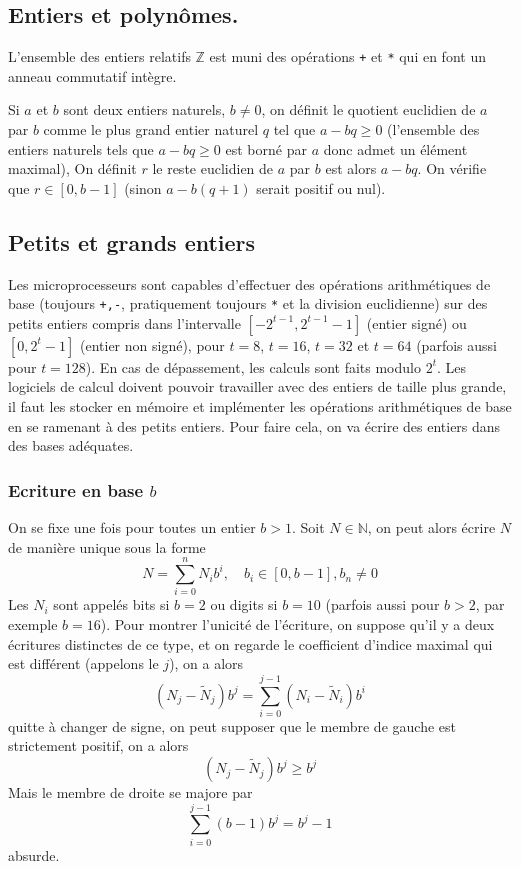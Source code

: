 \documentclass[a4paper,11pt]{book}
\begin{document}
\begin{giacjshere}
\section{Entiers et polyn\^omes.}
L'ensemble des entiers relatifs $\mathbb{Z}$ est muni des op\'erations
\verb|+| et \verb|*| qui en font un anneau commutatif int\`egre. 

Si $a$ et $b$ sont deux entiers naturels, $b \neq 0$, on d\'efinit le
quotient euclidien de $a$ par $b$ comme le plus grand entier naturel
$q$  tel que $a-bq \geq 0$ (l'ensemble des entiers naturels tels que
$a-bq \geq 0$ est born\'e par $a$ donc admet un \'el\'ement maximal),
On d\'efinit $r$ le reste euclidien de $a$ par $b$ est alors $a-bq$. On v\'erifie
que $r \in [0,b-1]$ (sinon $a-b(q+1)$ serait positif ou nul).

\subsection{Petits et grands entiers}
Les microprocesseurs sont capables d'effectuer des
op\'erations arithm\'etiques de base (toujours \verb|+,-|, pratiquement
toujours \verb|*| et la division euclidienne) sur des petits entiers compris dans l'intervalle
$[-2^{t-1},2^{t-1}-1]$ (entier sign\'e) ou $[0,2^{t}-1]$ (entier non
sign\'e), pour $t=8$, $t=16$, $t=32$ et $t=64$ (parfois aussi pour
$t=128$). En cas de d\'epassement, les calculs sont faits modulo
$2^t$.
Les logiciels de calcul doivent pouvoir travailler avec des entiers de
taille plus grande, il faut les stocker en m\'emoire et impl\'ementer
les op\'erations arithm\'etiques de base en se ramenant \`a des petits
entiers.
Pour faire cela, on va \'ecrire des entiers dans des bases ad\'equates.

\subsubsection{Ecriture en base $b$}
On se fixe une fois pour toutes un entier $b>1$. 
Soit $N \in \mathbb{N}$,  on peut alors \'ecrire $N$ de
mani\`ere unique  sous la forme
\begin{equation} \label{eq:base}
N=\sum_{i=0}^n N_i b^i , \quad b_i \in [0,b-1], b_n \neq 0 
\end{equation}
Les $N_i$ sont appel\'es bits si $b=2$ ou digits si $b=10$ (parfois
aussi pour $b>2$, par exemple $b=16$).
Pour montrer l'unicit\'e de l'\'ecriture, on suppose qu'il y a deux \'ecritures
distinctes de ce
type, et on regarde le coefficient d'indice maximal qui est
diff\'erent (appelons le $j$), on a alors
$$ (N_j-\tilde{N}_j)b^j = \sum_{i=0}^{j-1} (N_i-\tilde{N}_i)b^i $$
quitte \`a changer de signe, on peut supposer que le membre de gauche
est strictement positif, on a alors
$$  (N_j-\tilde{N}_j)b^j \geq b^j $$
Mais le membre de droite se majore par
$$ \sum_{i=0}^{j-1} (b-1) b^j=b^j-1$$
absurde.


\end{giacjshere}
\end{document}
